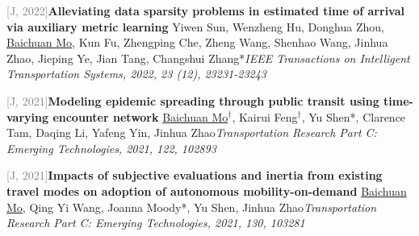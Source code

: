 \par\noindent\begin{minipage}{\linewidth}
{\textcolor{gray}{[J\themyCounter, 2022]\;}}{\textbf{Alleviating data sparsity problems in estimated time of arrival via auxiliary metric learning} \href{https://doi.org/10.1109/TITS.2022.3200445}{\textcolor{cadmiumorange}{\faExternalLink}}}{\newline Yiwen Sun, Wenzheng Hu, Donghua Zhou, \underline{Baichuan Mo}, Kun Fu, Zhengping Che, Zheng Wang, Shenhao Wang, Jinhua Zhao, Jieping Ye, Jian Tang, Changshui Zhang*}{\newline \emph{IEEE Transactions on Intelligent Transportation Systems, 2022, 23 (12), 23231-23243}}{{\;     }}{}
\end{minipage}\par\vspace{5.5pt}


\par\noindent\begin{minipage}{\linewidth}
{\textcolor{gray}{[J\themyCounter, 2021]\;}}{\textbf{Modeling epidemic spreading through public transit using time-varying encounter network} \href{https://doi.org/10.1016/j.trc.2020.102893}{\textcolor{cadmiumorange}{\faExternalLink}}}{\newline \underline{Baichuan Mo}$^\dagger$, Kairui Feng$^\dagger$, Yu Shen*, Clarence Tam, Daqing Li, Yafeng Yin, Jinhua Zhao}{\newline \emph{Transportation Research Part C: Emerging Technologies, 2021, 122, 102893}}{{\;     }}{}
\end{minipage}\par\vspace{5.5pt}


\par\noindent\begin{minipage}{\linewidth}
{\textcolor{gray}{[J\themyCounter, 2021]\;}}{\textbf{Impacts of subjective evaluations and inertia from existing travel modes on adoption of autonomous mobility-on-demand} \href{https://doi.org/10.1016/j.trc.2021.103281}{\textcolor{cadmiumorange}{\faExternalLink}}}{\newline \underline{Baichuan Mo}, Qing Yi Wang, Joanna Moody*, Yu Shen, Jinhua Zhao}{\newline \emph{Transportation Research Part C: Emerging Technologies, 2021, 130, 103281}}{{\;     }}{}
\end{minipage}\par\vspace{5.5pt}



